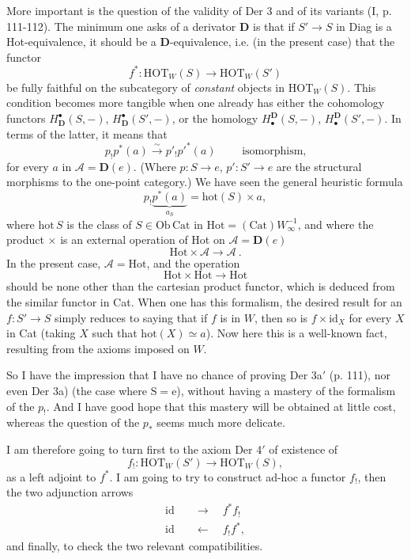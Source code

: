 \documentclass[11pt]{article}
\newcommand{\printedpage}[1]{\marginpar{\footnotesize p.~#1}}
\newcommand{\msp}[1]{\marginpar{\footnotesize [#1]}}
\newcommand{\HOT}{\mathrm{HOT}}
\newcommand{\Hot}{\mathrm{Hot}}
\newcommand{\Cat}{\mathrm{Cat}}
\newcommand{\Ob}{\mathrm{Ob}}
\newcommand{\hot}{\mathrm{hot}}
\begin{document}
More important is the question of the validity of Der 3 and of its variants (I, p. 111-112). The minimum one asks of a derivator $\mathbf{D}$ is that if $S'\longrightarrow S$ in Diag is a Hot-equivalence, it should be a $\mathbf{D}$-equivalence, i.e. (in the present case) that the functor
\[ f^* : \HOT_W(S) \longrightarrow \HOT_W(S') \]
be fully faithful on the subcategory of \textit{constant} objects in $\HOT_W(S)$. This condition becomes more tangible when one already has either the cohomology functors $H^\bullet_{\mathbf{D}}(S,-)$, $H^\bullet_{\mathbf{D}}(S',-)$, or the homology $H_\bullet^{\mathbf{D}}(S,-)$, $H_\bullet^{\mathbf{D}}(S',-)$. In terms of the latter, it means that
\[ p_!p^*(a) \xrightarrow{\sim} p'_!p'^*(a) \qquad \text{ isomorphism,} \]
\msp{page 133}
for every $a$ in $\mathcal{A}=\mathbf{D}(e)$. (Where $p:S\longrightarrow e$, $p':S'\longrightarrow e$ are the structural morphisms to the one-point category.) We have seen the general heuristic formula
\[ p_!\underbrace{p^*(a)}_{a_S} = \hot(S)\times a, \]
where $\hot\,S$ is the class of $S\in\Ob\,\Cat$ in $\Hot=(\Cat)W_\infty^{-1}$, and where the product $\times$ is an external operation of Hot on $\mathcal{A}=\mathbf{D}(e)$
\[ \Hot\times\mathcal{A} \longrightarrow \mathcal{A}\ . \]
In the present case, $\mathcal{A}=\Hot$, and the operation
\[ \Hot\times\Hot \longrightarrow \Hot \]
should be none other than the cartesian product functor, which is deduced from the similar functor in Cat. When one has this formalism, the desired result for an $f:S'\longrightarrow S$ simply reduces to saying that if $f$ is in $W$, then so is $f\times\mathrm{id}_X$ for every $X$ in Cat (taking $X$ such that $\hot(X)\simeq a$). Now here this is a well-known fact, resulting from the axioms imposed on $W$.

So I have the impression that I have no chance of proving Der 3a$'$ (p. 111), nor even Der 3a) (the case where $\mathrm{S}=\mathrm{e}$), without having a mastery of the formalism of the $p_!$. And I have
\printedpage{82}
\msp{page 134}
good hope that this mastery will be obtained at little cost, whereas the question of the $p_*$ seems much more delicate. %

I am therefore going to turn first to the axiom Der 4$'$ of existence of
\[ f_! : \HOT_W(S') \longrightarrow \HOT_W(S), \]
as a left adjoint to $f^*$. I am going to try to construct ad-hoc a functor $f_!$, then the two adjunction arrows
\[ \begin{aligned} \mathrm{id} &\quad\longrightarrow\quad f^*f_! \\ \mathrm{id} &\quad\longleftarrow\quad f_!f^*, \end{aligned} \]
and finally, to check the two relevant compatibilities.
\end{document}
